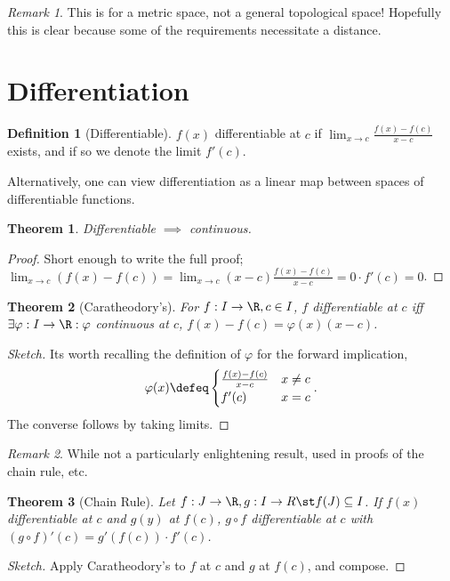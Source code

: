 \documentclass[12pt, oneside]{article}
\theoremstyle{definition}
\newtheorem{defn}{Definition}
\theoremstyle{plain}
\newtheorem{thm}{Theorem}
\theoremstyle{remark}
\newtheorem{remark}{Remark}
\let\origsection=\section
\renewcommand\section[1]{\origsection{#1}\label{sec:\thesection}}
\begin{document}
\begin{remark}
  This is for a metric space, not a general topological space! Hopefully this is clear because some of the requirements necessitate a distance.
\end{remark}


\section{Differentiation}
\begin{defn}[Differentiable]
  $f(x)$ differentiable at $c$ if $\lim_{x \to c} \frac{f(x) -f(c)}{x - c}$ exists, and if so we denote the limit $f'(c)$.

  Alternatively, one can view differentiation as a linear map between spaces of differentiable functions.
\end{defn}

\begin{thm}
  Differentiable $\implies$ continuous.
\end{thm}
\begin{proof}
  Short enough to write the full proof; $\lim_{x \to c} (f(x) - f(c)) = \lim_{x\to c} (x - c) \frac{f(x) - f(c)}{x-c} = 0 \cdot f'(c) = 0$.
\end{proof}

\begin{thm}[Caratheodory's]
  For $f : I \to \R, c \in I$, $f$ differentiable at $c$ iff $\exists \varphi : I \to \R : \varphi$ continuous at $c$, $f(x) - f(c) = \varphi(x) (x-c)$.
\end{thm}

\begin{proof}[Sketch]
  Its worth recalling the definition of $\varphi$ for the forward implication, $$\varphi(x) \defeq \begin{cases}
    \frac{f(x) - f(c)}{x - c} & x \neq c\\
    f'(c) & x = c
  \end{cases}.$$ The converse follows by taking limits.
\end{proof}

\begin{remark}
  While not a particularly enlightening result, used in proofs of the chain rule, etc.
\end{remark}

\begin{thm}[Chain Rule]
  Let $f : J \to \R, g : I \to R \st f(J) \subseteq I$. If $f(x)$ differentiable at $c$ and $g(y)$ at $f(c)$, $g \circ f$ differentiable at $c$ with $(g \circ f)'(c) = g'(f(c))\cdot f'(c)$.
\end{thm}
\begin{proof}[Sketch]
  Apply Caratheodory's to $f$ at $c$ and $g$ at $f(c)$, and compose.
\end{proof}
\end{document}
